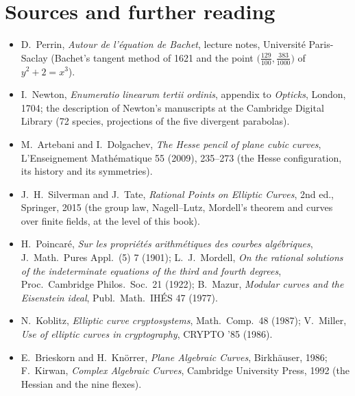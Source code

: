 \section*{Sources and further reading}

\begin{itemize}
\item D.~Perrin, \emph{Autour de l'\'equation de Bachet}, lecture notes, Universit\'e Paris-Saclay (Bachet's tangent method of 1621 and the point $\bigl(\frac{129}{100},\frac{383}{1000}\bigr)$
of $y^2+2=x^3$).
\item I.~Newton, \emph{Enumeratio linearum tertii ordinis}, appendix to \emph{Opticks}, London, 1704; the description of Newton's manuscripts at the
Cambridge Digital Library (72 species, projections of the five divergent parabolas).
\item M.~Artebani and I.~Dolgachev, \emph{The Hesse pencil of plane cubic curves}, L'Enseignement Math\'ematique 55 (2009), 235--273 (the Hesse
configuration, its history and its symmetries).
\item J.~H.~Silverman and J.~Tate, \emph{Rational Points on Elliptic Curves}, 2nd ed., Springer, 2015 (the group law, Nagell--Lutz, Mordell's theorem and
curves over finite fields, at the level of this book).
\item H.~Poincar\'e, \emph{Sur les propri\'et\'es arithm\'etiques des courbes alg\'ebriques}, J.\ Math.\ Pures Appl.\ (5) 7 (1901); L.~J.~Mordell, \emph{On the
rational solutions of the indeterminate equations of the third and fourth degrees}, Proc.\ Cambridge Philos.\ Soc.\ 21 (1922); B.~Mazur, \emph{Modular
curves and the Eisenstein ideal}, Publ.\ Math.\ IH\'ES 47 (1977).
\item N.~Koblitz, \emph{Elliptic curve cryptosystems}, Math.\ Comp.\ 48 (1987); V.~Miller, \emph{Use of elliptic curves in cryptography}, CRYPTO '85 (1986).
\item E.~Brieskorn and H.~Kn\"orrer, \emph{Plane Algebraic Curves}, Birkh\"auser, 1986; F.~Kirwan, \emph{Complex Algebraic Curves}, Cambridge University Press,
1992 (the Hessian and the nine flexes).
\end{itemize}
